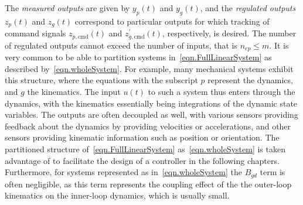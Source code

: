 The \textit{measured outputs} are given by $y_{p}(t)$ and $y_{g}(t)$, and the \textit{regulated outputs} $z_{p}(t)$ and $z_{g}(t)$ correspond to particular outputs for which tracking of command signals $z_{p,\text{cmd}}(t)$ and $z_{g,\text{cmd}}^{\prime}(t)$, respectively, is desired.
The number of regulated outputs cannot exceed the number of inputs, that is $n_{ep}\leq m$.
It is very common to be able to partition systems in\ \eqref{eqn.FullLinearSystem} as described by\ \eqref{eqn.wholeSystem}.
For example, many mechanical systems exhibit this structure, where the equations with the subscript $p$ represent the dynamics, and $g$ the kinematics.
The input $u(t)$ to such a system thus enters through the dynamics, with the kinematics essentially being integrations of the dynamic state variables.
The outputs are often decoupled as well, with various sensors providing feedback about the dynamics by providing velocities or accelerations, and other sensors providing kinematic information such as position or orientation.
The partitioned structure of\ \eqref{eqn.FullLinearSystem} as\ \eqref{eqn.wholeSystem} is taken advantage of to facilitate the design of a controller in the following chapters.
Furthermore, for systems represented as in\ \eqref{eqn.wholeSystem} the $B_{gd}$ term is often negligible, as this term represents the coupling effect of the the outer-loop kinematics on the inner-loop dynamics, which is usually small.

